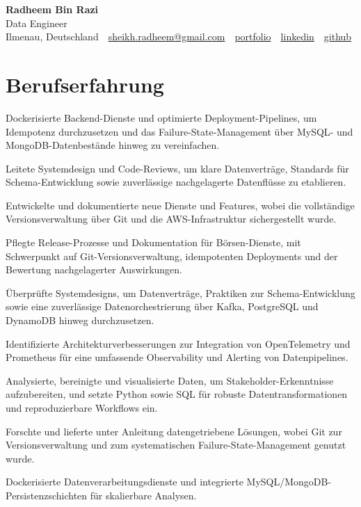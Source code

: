\documentclass[11pt,a4paper]{resume}
\makeatletter
\newcommand{\Portfolio}{https://radheem.github.io/my-cv}
\newcommand{\PortfolioText}{portfolio}
\newcommand{\GitHub}{https://github.com/radheem}
\newcommand{\LinkedIn}{https://www.linkedin.com/in/radheem-razi}
\newcommand{\Email}{sheikh.radheem@gmail.com}
\makeatother
\begin{document}
\clearpage
{}

\begin{center}
  {\huge\bfseries Radheem Bin Razi}\\[3pt]
  {\large Data Engineer}\\[6pt]
  \small
  Ilmenau, Deutschland \,\textbar\,
  \href{mailto:\Email}{\Email} \,\textbar\,
  \href{\Portfolio}{\PortfolioText} \,\textbar\,
  \href{\LinkedIn}{linkedin} \,\textbar\,
  \href{\GitHub}{github}
\end{center}
\vspace{2pt}

\section{Berufserfahrung}

\bullets
  \item Dockerisierte Backend-Dienste und optimierte Deployment-Pipelines, um Idempotenz durchzusetzen und das Failure-State-Management über MySQL- und MongoDB-Datenbestände hinweg zu vereinfachen.
  \item Leitete Systemdesign und Code-Reviews, um klare Datenverträge, Standards für Schema-Entwicklung sowie zuverlässige nachgelagerte Datenflüsse zu etablieren.
  \item Entwickelte und dokumentierte neue Dienste und Features, wobei die vollständige Versionsverwaltung über Git und die AWS-Infrastruktur sichergestellt wurde.
\bulletsend
\vspace{3pt}
\bullets
  \item Pflegte Release-Prozesse und Dokumentation für Börsen-Dienste, mit Schwerpunkt auf Git-Versionsverwaltung, idempotenten Deployments und der Bewertung nachgelagerter Auswirkungen.
  \item Überprüfte Systemdesigns, um Datenverträge, Praktiken zur Schema-Entwicklung sowie eine zuverlässige Datenorchestrierung über Kafka, PostgreSQL und DynamoDB hinweg durchzusetzen.
  \item Identifizierte Architekturverbesserungen zur Integration von OpenTelemetry und Prometheus für eine umfassende Observability und Alerting von Datenpipelines.
\bulletsend
\vspace{3pt}
\bullets
  \item Analysierte, bereinigte und visualisierte Daten, um Stakeholder-Erkenntnisse aufzubereiten, und setzte Python sowie SQL für robuste Datentransformationen und reproduzierbare Workflows ein.
  \item Forschte und lieferte unter Anleitung datengetriebene Lösungen, wobei Git zur Versionsverwaltung und zum systematischen Failure-State-Management genutzt wurde.
  \item Dockerisierte Datenverarbeitungsdienste und integrierte MySQL/MongoDB-Persistenzschichten für skalierbare Analysen.
\bulletsend
\vspace{3pt}
\end{document}
